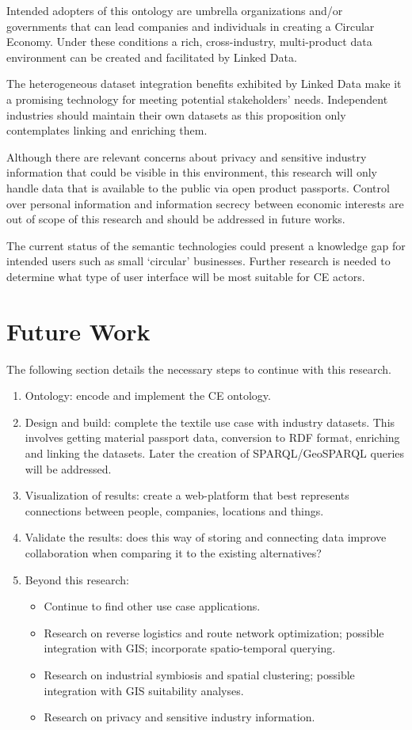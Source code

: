 \documentclass[runningheads,a4paper]{llncs}
\begin{document}
Intended adopters of this ontology are umbrella organizations and/or governments that can lead companies and individuals in creating a Circular Economy. Under these conditions a rich, cross-industry, multi-product data environment can be created and facilitated by Linked Data. 

The heterogeneous dataset integration benefits exhibited by Linked Data make it a promising technology for meeting potential stakeholders' needs. Independent industries should maintain their own datasets as this proposition only contemplates linking and enriching them. 

Although there are relevant concerns about privacy and sensitive industry information that could be visible in this environment, this research will only handle data that is available to the public via open product passports. Control over personal information and information secrecy between economic interests are out of scope of this research and should be addressed in future works. 

The current status of the semantic technologies could present a knowledge gap for intended users such as small `circular' businesses. Further research is needed to determine what type of user interface will be most suitable for CE actors. 

\section{Future Work}

The following section details the necessary steps to continue with this research. 
\begin{enumerate}
\item Ontology: encode and implement the CE ontology.
\item Design and build: complete the textile use case with industry datasets. This involves getting material passport data, conversion to RDF format, enriching and linking the datasets. Later the creation of SPARQL/GeoSPARQL queries will be addressed.
\item Visualization of results: create a web-platform that best represents connections between people, companies, locations and things.
\item Validate the results: does this way of storing and connecting data improve collaboration when comparing it to the existing alternatives?
\item Beyond this research:
\begin{itemize}
\item Continue to find other use case applications.
\item Research on reverse logistics and route network optimization; possible integration with GIS; incorporate spatio-temporal querying. 
\item Research on industrial symbiosis and spatial clustering; possible integration with GIS suitability analyses.
\item Research on privacy and sensitive industry information.
\end{itemize}
\end{enumerate}
\end{document}

